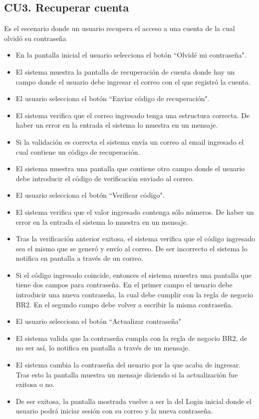 \newpage
\subsection{CU3. Recuperar cuenta}  \par
Es el escenario donde un usuario recupera el acceso a una cuenta de la cual olvidó su contraseña
\begin{itemize}
	\item En la pantalla inicial el usuario selecciona el botón ``Olvidé mi contraseña".
	\item El sistema muestra la pantalla de recuperación de cuenta donde hay un campo donde el usuario debe ingresar el correo con el que registró la cuenta.
	\item El usuario selecciona el botón ``Enviar código de recuperación".
	\item El sistema verifica que el correo ingresado tenga una estructura correcta. De haber un error en la entrada el sistema lo muestra en un mensaje.
	\item Si la validación es correcta el sistema envía un correo al email ingresado el cual contiene un código de recuperación.
	\item El sistema muestra una pantalla que contiene otro campo donde el usuario debe introducir el código de verificación enviado al correo.
	\item El usuario selecciona el botón ``Verificar código".
	\item El sistema verifica que el valor ingresado contenga sólo números. De haber un error en la entrada el sistema lo muestra en un mensaje.
	\item Tras la verificación anterior exitosa, el sistema verifica que el código ingresado sea el mismo que se generó y envío al correo. De ser incorrecto el sistema lo notifica en pantalla a través de un correo.
	\item Si el código ingresado coincide, entonces el sistema muestra una pantalla que tiene dos campos para contraseña. En el primer campo el usuario debe introducir una nueva contraseña, la cual debe cumplir con la regla de negocio BR2. En el segundo campo debe volver a escribir la misma contraseña.
	\item El usuario selecciona el botón ``Actualizar contraseña"
	\item El sistema valida que la contraseña cumpla con la regla de negocio BR2, de no ser así, lo notifica en pantalla a través de un mensaje.
	\item El sistema cambia la contraseña del usuario por la que acaba de ingresar. Tras esto la pantalla muestra un mensaje diciendo si la actualización fue exitosa o no.
	\item De ser exitosa, la pantalla mostrada vuelve a ser la del Login inicial donde el usuario podrá iniciar sesión con su correo y la nueva contraseña.
\end{itemize}

